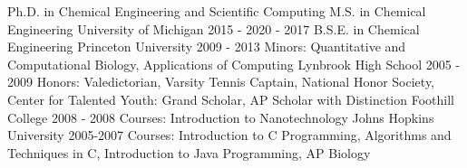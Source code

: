 \begin{cventries}
  \cventry
    {Ph.D. in Chemical Engineering and Scientific Computing \linebreak M.S. in Chemical Engineering} %
    {University of Michigan} %
    {} %
    {2015 - 2020  - 2017} %
    {
    }
  \cventry
    {B.S.E. in Chemical Engineering} %
    {Princeton University} %
    {} %
    {2009 - 2013} %
    {\scriptsize Minors: Quantitative and Computational Biology, Applications of Computing
    }
\ifoutdated
  \cventry
    {} %
    {Lynbrook High School} %
    {} %
    {2005 - 2009} %
    {\scriptsize Honors: Valedictorian, Varsity Tennis Captain, National Honor Society, Center for Talented Youth: Grand Scholar, AP Scholar with Distinction
    }
  \cventry
    {} %
    {Foothill College} %
    {} %
    {2008 - 2008} %
    {\scriptsize Courses: Introduction to Nanotechnology
    }
  \cventry
    {} %
    {Johns Hopkins University} %
    {} %
    {2005-2007} %
    {\scriptsize Courses: Introduction to C Programming, Algorithms and Techniques in C, Introduction to Java Programming, AP Biology
    }
\fi
\end{cventries}

